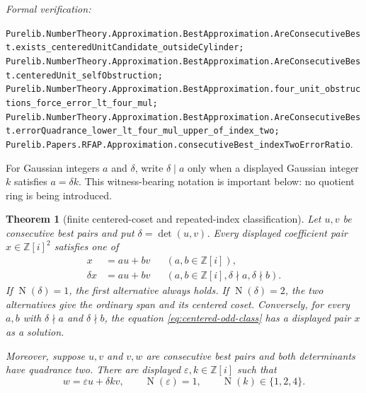 \documentclass[11pt]{article}
\newtheorem{theorem}{Theorem}[section]
\newcommand{\Zi}{\mathbb{Z}[i]}
\newcommand{\Norm}[1]{\operatorname{N}\!\left(#1\right)}
\newcommand{\leanref}[1]{\par\smallskip\noindent
  \emph{Formal verification:}\par\nobreak
  {\raggedright\nolinkurl{#1}.\par}}
\begin{document}
\leanref{Purelib.NumberTheory.Approximation.BestApproximation.AreConsecutiveBest.exists_centeredUnitCandidate_outsideCylinder;
Purelib.NumberTheory.Approximation.BestApproximation.AreConsecutiveBest.centeredUnit_selfObstruction;
Purelib.NumberTheory.Approximation.BestApproximation.four_unit_obstructions_force_error_lt_four_mul;
Purelib.NumberTheory.Approximation.BestApproximation.AreConsecutiveBest.errorQuadrance_lower_lt_four_mul_upper_of_index_two;
Purelib.Papers.RFAP.Approximation.consecutiveBest_indexTwoErrorRatio}

For Gaussian integers $a$ and $\delta$, write $\delta\mid a$ only when a
displayed Gaussian integer $k$ satisfies $a=\delta k$.  This witness-bearing
notation is important below: no quotient ring is being introduced.

\begin{theorem}[finite centered-coset and repeated-index classification]
\label{thm:finite-centered-coset}
Let $u,v$ be consecutive best pairs and put $\delta=\det(u,v)$.  Every
displayed coefficient pair $x\in\Zi^2$ satisfies one of
\begin{align}
 x&=a u+b v &&(a,b\in\Zi),
 \label{eq:centered-integral-class}\\
 \delta x&=a u+b v &&(a,b\in\Zi, \delta\nmid a, \delta\nmid b).
 \label{eq:centered-odd-class}
\end{align}
If $\Norm\delta=1$, the first alternative always holds.  If
$\Norm\delta=2$, the two alternatives give the ordinary span and its
centered coset.  Conversely, for every $a,b$ with
$\delta\nmid a$ and $\delta\nmid b$, the equation
\eqref{eq:centered-odd-class} has a displayed pair $x$ as a solution.

Moreover, suppose $u,v$ and $v,w$ are consecutive best pairs and both
determinants have quadrance two.  There are displayed
$\varepsilon,k\in\Zi$ such that
\begin{equation}
\label{eq:repeated-index-normal-form}
          w=\varepsilon u+\delta k v,
          \qquad \Norm\varepsilon=1,
          \qquad \Norm k\in\{1,2,4\}.
\end{equation}
\end{theorem}
\end{document}
